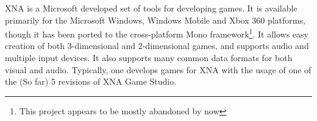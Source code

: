 XNA is a Microsoft developed set of tools for developing games. It is available
primarily for the Microsoft Windows, Windows Mobile and Xbox 360 platforms, though
it has been ported to the cross-platform Mono framework\footnote{This project
appears to be mostly abandoned by now}.
It allows easy creation of both 3-dimensional and 2-dimensional games,
and supports audio and multiple input devices. It also supports many common data
formats for both visual and audio. Typically, one develops games for XNA with the
usage of one of the (So far) 5 revisions of XNA Game Studio.
